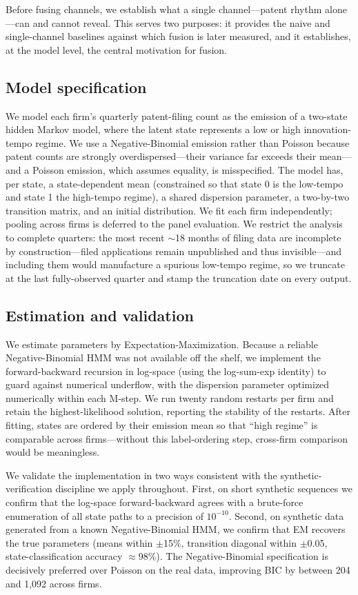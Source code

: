 \documentclass[11pt]{article}
\begin{document}
Before fusing channels, we establish what a single channel---patent rhythm alone---can and cannot reveal. This serves two purposes: it provides the naive and single-channel baselines against which fusion is later measured, and it establishes, at the model level, the central motivation for fusion.

\subsection{Model specification}

We model each firm's quarterly patent-filing count as the emission of a two-state hidden Markov model, where the latent state represents a low or high innovation-tempo regime. We use a Negative-Binomial emission rather than Poisson because patent counts are strongly overdispersed---their variance far exceeds their mean---and a Poisson emission, which assumes equality, is misspecified. The model has, per state, a state-dependent mean (constrained so that state 0 is the low-tempo and state 1 the high-tempo regime), a shared dispersion parameter, a two-by-two transition matrix, and an initial distribution. We fit each firm independently; pooling across firms is deferred to the panel evaluation. We restrict the analysis to complete quarters: the most recent $\sim$18 months of filing data are incomplete by construction---filed applications remain unpublished and thus invisible---and including them would manufacture a spurious low-tempo regime, so we truncate at the last fully-observed quarter and stamp the truncation date on every output.

\subsection{Estimation and validation}

We estimate parameters by Expectation-Maximization. Because a reliable Negative-Binomial HMM was not available off the shelf, we implement the forward-backward recursion in log-space (using the log-sum-exp identity) to guard against numerical underflow, with the dispersion parameter optimized numerically within each M-step. We run twenty random restarts per firm and retain the highest-likelihood solution, reporting the stability of the restarts. After fitting, states are ordered by their emission mean so that ``high regime'' is comparable across firms---without this label-ordering step, cross-firm comparison would be meaningless.

We validate the implementation in two ways consistent with the synthetic-verification discipline we apply throughout. First, on short synthetic sequences we confirm that the log-space forward-backward agrees with a brute-force enumeration of all state paths to a precision of $10^{-10}$. Second, on synthetic data generated from a known Negative-Binomial HMM, we confirm that EM recovers the true parameters (means within $\pm$15\%, transition diagonal within $\pm$0.05, state-classification accuracy $\approx$98\%). The Negative-Binomial specification is decisively preferred over Poisson on the real data, improving BIC by between 204 and 1,092 across firms.
\end{document}
